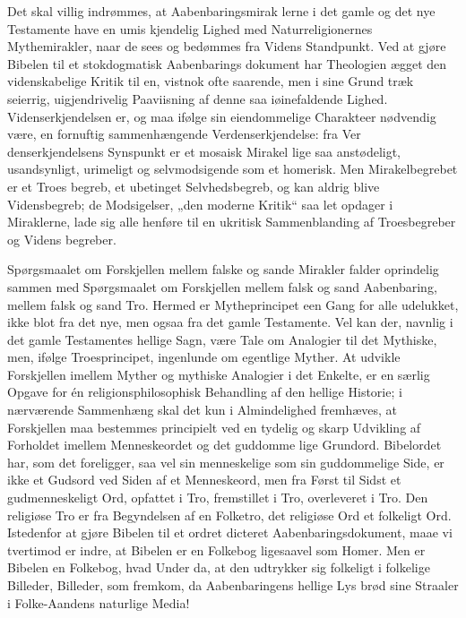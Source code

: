 \documentclass[12pt]{book}
\newcommand{\opage}[1]{\marginnote{\footnotesize\textit{[#1]}}}
\begin{document}
Det skal villig indrømmes, at Aabenbaringsmirak\-%
lerne i det gamle og det nye Testamente have en umis\-%
kjendelig Lighed med Naturreligionernes Mythemirakler,
naar de sees og bedømmes fra Videns Standpunkt. Ved
at gjøre Bibelen til et stokdogmatisk Aabenbarings\-%
dokument har Theologien ægget den videnskabelige
Kritik til en, vistnok ofte saarende, men i sine Grund\-%
træk seierrig, uigjendrivelig Paaviisning af denne saa
iøinefaldende Lighed. Videnserkjendelsen er, og maa
ifølge sin eiendommelige Charakteer nødvendig være, en
fornuftig sammenhængende Verdenserkjendelse: fra Ver\-%
denserkjendelsens Synspunkt er et mosaisk Mirakel lige\-%
saa anstødeligt, usandsynligt, urimeligt og selvmodsigende
som et homerisk. Men Mirakelbegrebet er et Troes\-%
begreb, et ubetinget Selvhedsbegreb, og kan aldrig blive
Vidensbegreb; de Modsigelser, „den moderne Kritik“
saa let opdager i Miraklerne, lade sig alle henføre til
en ukritisk Sammenblanding af Troesbegreber og Videns\-%
begreber.

Spørgsmaalet om Forskjellen mellem falske og sande
Mirakler falder oprindelig sammen med Spørgsmaalet
om Forskjellen mellem falsk og sand Aabenbaring,
mellem falsk og sand Tro. Hermed er Mytheprincipet
een Gang for alle udelukket, ikke blot fra det nye, men
ogsaa fra det gamle Testamente. Vel kan der, navnlig
i det gamle Testamentes hellige Sagn, være Tale om
Analogier til det Mythiske, men, ifølge Troesprincipet,
ingenlunde om egentlige Myther. At udvikle Forskjellen
imellem Myther og mythiske Analogier i det Enkelte, er
en særlig Opgave for én religionsphilosophisk Behandling %
af den hellige Historie; i nærværende Sammenhæng skal
det kun i Almindelighed fremhæves, at Forskjellen maa
\opage{104}\setcounter{footnote}{0}%
bestemmes principielt ved en tydelig og skarp Udvikling
af Forholdet imellem Menneskeordet og det guddomme\-%
lige Grundord. Bibelordet har, som det foreligger, saa\-%
vel sin menneskelige som sin guddommelige Side, er
ikke et Gudsord ved Siden af et Menneskeord, men fra
Først til Sidst et gudmenneskeligt Ord, opfattet i Tro,
fremstillet i Tro, overleveret i Tro. Den religiøse Tro
er fra Begyndelsen af en Folketro, det religiøse Ord et
folkeligt Ord. Istedenfor at gjøre Bibelen til et ordret
dicteret Aabenbaringsdokument, maae vi tvertimod er\-%
indre, at Bibelen er en Folkebog ligesaavel som Homer.
Men er Bibelen en Folkebog, hvad Under da, at den
udtrykker sig folkeligt i folkelige Billeder, Billeder, som
fremkom, da Aabenbaringens hellige Lys brød sine
Straaler i Folke-Aandens naturlige Media!
\end{document}
